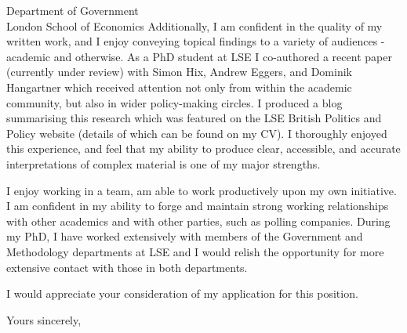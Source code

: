 \documentclass{letter} %
\begin{document}
\begin{letter}{Department of Government \\
London School of Economics}
Additionally, I am confident in the quality of my written work, and I enjoy conveying topical findings to a variety of audiences - academic and otherwise. As a PhD student at LSE I co-authored a recent paper (currently under review) with Simon Hix, Andrew Eggers, and Dominik Hangartner which received attention not only from within the academic community, but also in wider policy-making circles. I produced a blog summarising this research which was featured on the LSE British Politics and Policy website (details of which can be found on my CV). I thoroughly enjoyed this experience, and feel that my ability to produce clear, accessible, and accurate interpretations of complex material is one of my major strengths.

I enjoy working in a team, am able to work productively upon my own initiative. I am confident in my ability to forge and maintain strong working relationships with other academics and with other parties, such as polling companies. During my PhD, I have worked extensively with members of the Government and Methodology departments at LSE and I would relish the opportunity for more extensive contact with those in both departments.
 


\noindent I would appreciate your consideration of my application for this position.
 
\closing{Yours sincerely,} 
 

 


\end{letter}
 
\end{document}
